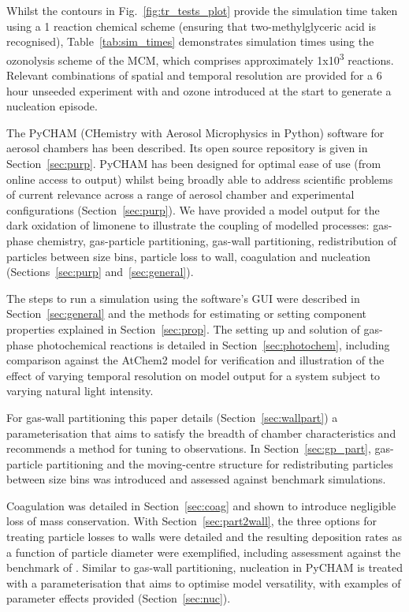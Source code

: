 \documentclass[gmd, manuscript]{copernicus}
\begin{document}
Whilst the contours in Fig.~\ref{fig:tr_tests_plot} provide the simulation time taken using a 1 reaction chemical scheme (ensuring that two-methylglyceric acid is recognised), Table~\ref{tab:sim_times} demonstrates simulation times using the  ozonolysis scheme of the MCM, which comprises approximately \unit{1x10^{3}} reactions.  Relevant combinations of spatial and temporal resolution are provided for a 6 hour unseeded experiment with  and ozone introduced at the start to generate a nucleation episode.

\conclusions  %

The PyCHAM (CHemistry with Aerosol Microphysics in Python) software for aerosol chambers has been described.  Its open source repository is given in Section~\ref{sec:purp}.  PyCHAM has been designed for optimal ease of use (from online access to output) whilst being broadly able to address scientific problems of current relevance across a range of aerosol chamber and experimental configurations (Section~\ref{sec:purp}).  We have provided a model output for the dark oxidation of limonene to illustrate the coupling of modelled processes: gas-phase chemistry, gas-particle partitioning, gas-wall partitioning, redistribution of particles between size bins, particle loss to wall, coagulation and nucleation (Sections~\ref{sec:purp} and~\ref{sec:general}).

The steps to run a simulation using the software's GUI were described in Section~\ref{sec:general} and the methods for estimating or setting component properties explained in Section~\ref{sec:prop}.  The setting up and solution of gas-phase photochemical reactions is detailed in Section~\ref{sec:photochem}, including comparison against the AtChem2 model \citep{Sommariva2018} for verification and illustration of the effect of varying temporal resolution on model output for a system subject to varying natural light intensity.

For gas-wall partitioning this paper details (Section~\ref{sec:wallpart}) a parameterisation that aims to satisfy the breadth of chamber characteristics and recommends a method for tuning to observations.  In Section~\ref{sec:gp_part}, gas-particle partitioning and the moving-centre structure for redistributing particles between size bins was introduced and assessed against benchmark simulations.

Coagulation was detailed in Section~\ref{sec:coag} and shown to introduce negligible loss of mass conservation.  With Section~\ref{sec:part2wall}, the three options for treating particle losses to walls were detailed and the resulting deposition rates as a function of particle diameter were exemplified, including assessment against the benchmark of \citet{McMurry1985}.  Similar to gas-wall partitioning, nucleation in PyCHAM is treated with a parameterisation that aims to optimise model versatility, with examples of parameter effects provided (Section~\ref{sec:nuc}).
\end{document}
